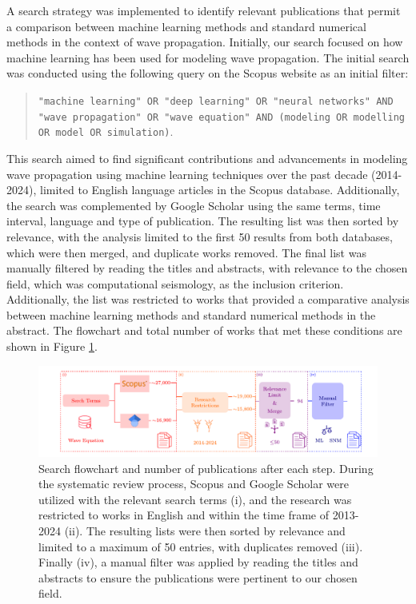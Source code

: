 \documentclass[11pt,twoside]{article}
\begin{document}
A search strategy was implemented to identify relevant publications that permit a comparison between machine 
learning methods and standard numerical methods in the context of wave propagation. Initially, our search focused 
on how machine learning has been used for modeling wave propagation. The initial search was conducted using the 
following query on the Scopus website as an initial filter: 

\begin{quote}
\noindent\texttt{"machine learning" OR "deep learning" OR "neural networks" AND "wave\linebreak
propagation" OR "wave equation" AND (modeling OR modelling OR model\linebreak
OR simulation)}.
\end{quote}

This search aimed to find significant contributions and advancements in modeling wave propagation using machine
learning techniques over the past decade (2014-2024), limited to English language articles in the Scopus 
database. Additionally, the search was complemented by Google Scholar using the same terms, time interval, 
language and type of publication. The resulting list was then sorted by relevance, with the analysis limited 
to the first 50 results from both databases, which were then merged, and duplicate works removed. The final 
list was manually filtered by reading the titles and abstracts, with relevance to the chosen field, which was
computational seismology, as the inclusion criterion. Additionally, the list was restricted to works that 
provided a comparative analysis between machine learning methods and standard numerical methods in the 
abstract. The flowchart and total number of works that met these conditions are shown in 
Figure \ref{fig:scheme_systematic_review}.

\begin{figure}[h]
    \includegraphics[width=1.0\textwidth]{figs/scheme_systematic_review.pdf}
\caption{Search flowchart and number of publications after each step. During the systematic review process, 
Scopus and Google Scholar were utilized with the relevant search terms (i), and the research was restricted to works 
in English and within the time frame of 2013-2024 (ii). The resulting lists were then sorted by relevance and limited 
to a maximum of 50 entries, with duplicates removed (iii). Finally (iv), a manual filter was applied by reading the 
titles and abstracts to ensure the publications were pertinent to our chosen field.}\label{fig:scheme_systematic_review}
\end{figure}
\end{document}
